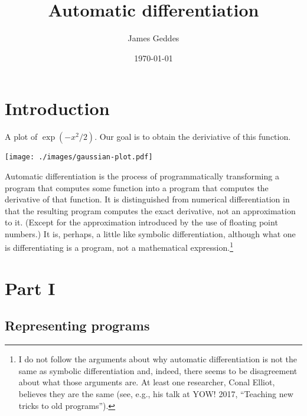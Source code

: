 \documentclass[11pt, a4paper]{article}
\title{Automatic differentiation}
\author{James Geddes}
\date{\today}
\begin{document}
\maketitle

\section{Introduction}%
\label{sec:introduction}

\begin{marginfigure}
  \caption{A plot of $\exp(-x^2/2)$. Our goal is to obtain the
    deriviative of this function.\label{fig:gaussian-plot}}
  \centering
  \texttt{[image: ./images/gaussian-plot.pdf]}
\end{marginfigure}
Automatic differentiation is the process of programmatically
transforming a program that computes some function into a program that
computes the derivative of that function. It is distinguished from
numerical differentiation in that the resulting program computes the
exact derivative, not an approximation to it. (Except for the
approximation introduced by the use of floating point numbers.) It is,
perhaps, a little like symbolic differentiation, although what one is
differentiating is a program, not a mathematical
expression.\footnote{I do not follow the arguments about why automatic
  differentiation is not the same as symbolic differentiation and,
  indeed, there seems to be disagreement about what those arguments
  are. At least one researcher, Conal Elliot, believes they are the
  same (see, e.g., his talk at YOW! 2017, ``Teaching new tricks to old
  programs'').}

\section{Part  I}

\subsection{Representing programs}
\end{document}
